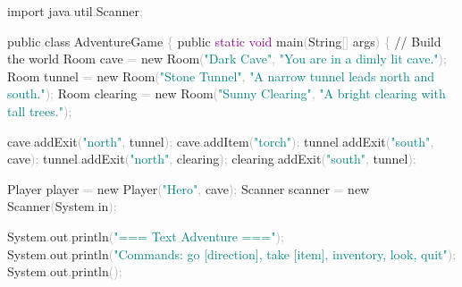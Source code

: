 \documentclass[
  justified,
  openright,
]{tufte-book}
\newcommand{\BuiltInTok}[1]{#1}
\newcommand{\CommentTok}[1]{\textcolor{MidGray}{#1}}
\newcommand{\DataTypeTok}[1]{\textcolor{Purple}{#1}}
\newcommand{\FunctionTok}[1]{\textcolor{BrandBlue}{#1}}
\newcommand{\ImportTok}[1]{\textcolor{BrandAccent}{#1}}
\newcommand{\KeywordTok}[1]{\textcolor{BrandBlue}{#1}}
\newcommand{\NormalTok}[1]{#1}
\newcommand{\OperatorTok}[1]{\textcolor{DarkGray}{#1}}
\newcommand{\StringTok}[1]{\textcolor{Teal}{#1}}
\newenvironment{Shaded}{%
  \begin{snugshade}
}{%
  \end{snugshade}
}
\begin{document}
\begin{Shaded}
\begin{Highlighting}[]
\KeywordTok{import} \ImportTok{java}\OperatorTok{.}\ImportTok{util}\OperatorTok{.}\ImportTok{Scanner}\OperatorTok{;}

\KeywordTok{public} \KeywordTok{class}\NormalTok{ AdventureGame }\OperatorTok{\{}
    \KeywordTok{public} \DataTypeTok{static} \DataTypeTok{void} \FunctionTok{main}\OperatorTok{(}\BuiltInTok{String}\OperatorTok{[]}\NormalTok{ args}\OperatorTok{)} \OperatorTok{\{}
        \CommentTok{// Build the world}
\NormalTok{        Room cave }\OperatorTok{=} \KeywordTok{new} \FunctionTok{Room}\OperatorTok{(}\StringTok{"Dark Cave"}\OperatorTok{,} \StringTok{"You are in a dimly lit cave."}\OperatorTok{);}
\NormalTok{        Room tunnel }\OperatorTok{=} \KeywordTok{new} \FunctionTok{Room}\OperatorTok{(}\StringTok{"Stone Tunnel"}\OperatorTok{,} \StringTok{"A narrow tunnel leads north and south."}\OperatorTok{);}
\NormalTok{        Room clearing }\OperatorTok{=} \KeywordTok{new} \FunctionTok{Room}\OperatorTok{(}\StringTok{"Sunny Clearing"}\OperatorTok{,} \StringTok{"A bright clearing with tall trees."}\OperatorTok{);}

\NormalTok{        cave}\OperatorTok{.}\FunctionTok{addExit}\OperatorTok{(}\StringTok{"north"}\OperatorTok{,}\NormalTok{ tunnel}\OperatorTok{);}
\NormalTok{        cave}\OperatorTok{.}\FunctionTok{addItem}\OperatorTok{(}\StringTok{"torch"}\OperatorTok{);}
\NormalTok{        tunnel}\OperatorTok{.}\FunctionTok{addExit}\OperatorTok{(}\StringTok{"south"}\OperatorTok{,}\NormalTok{ cave}\OperatorTok{);}
\NormalTok{        tunnel}\OperatorTok{.}\FunctionTok{addExit}\OperatorTok{(}\StringTok{"north"}\OperatorTok{,}\NormalTok{ clearing}\OperatorTok{);}
\NormalTok{        clearing}\OperatorTok{.}\FunctionTok{addExit}\OperatorTok{(}\StringTok{"south"}\OperatorTok{,}\NormalTok{ tunnel}\OperatorTok{);}

\NormalTok{        Player player }\OperatorTok{=} \KeywordTok{new} \FunctionTok{Player}\OperatorTok{(}\StringTok{"Hero"}\OperatorTok{,}\NormalTok{ cave}\OperatorTok{);}
        \BuiltInTok{Scanner}\NormalTok{ scanner }\OperatorTok{=} \KeywordTok{new} \BuiltInTok{Scanner}\OperatorTok{(}\BuiltInTok{System}\OperatorTok{.}\FunctionTok{in}\OperatorTok{);}

        \BuiltInTok{System}\OperatorTok{.}\FunctionTok{out}\OperatorTok{.}\FunctionTok{println}\OperatorTok{(}\StringTok{"=== Text Adventure ==="}\OperatorTok{);}
        \BuiltInTok{System}\OperatorTok{.}\FunctionTok{out}\OperatorTok{.}\FunctionTok{println}\OperatorTok{(}\StringTok{"Commands: go [direction], take [item], inventory, look, quit"}\OperatorTok{);}
        \BuiltInTok{System}\OperatorTok{.}\FunctionTok{out}\OperatorTok{.}\FunctionTok{println}\OperatorTok{();}


\end{Highlighting}
\end{Shaded}
\end{document}
